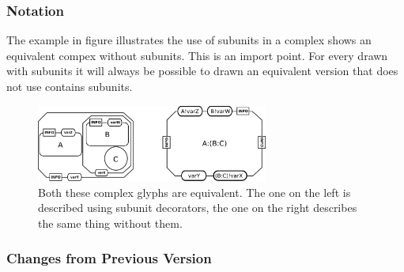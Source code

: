 \subsubsection{Notation}

The example in figure  illustrates the use of
subunits in a complex shows an equivalent compex without
subunits. This is an import point. For every  drawn
with subunits it will always be possible to drawn an equivalent
version that does not use contains subunits.

\begin{figure}[H]
  \centering
  \includegraphics[width = 3.0in]{images/complex}
  \caption{Both these complex glyphs are equivalent. The one on the
    left is described using subunit decorators, the one on the right
    describes the same thing without them.}
  \label{fig:complexSubunits}
\end{figure}

\subsubsection{Changes from Previous Version}







